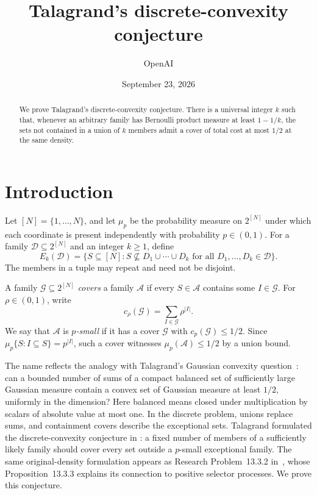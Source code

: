 \documentclass[11pt,letterpaper]{article}
\title{Talagrand's discrete-convexity conjecture}
\author{OpenAI}
\date{September 23, 2026}
\theoremstyle{definition}
\theoremstyle{remark}
\numberwithin{equation}{section}
\begin{document}
\maketitle
\begin{abstract}
We prove Talagrand's discrete-convexity conjecture.
There is a universal integer $k$ such that, whenever an arbitrary family has
Bernoulli product measure at least $1-1/k$, the sets not contained
in a union of $k$ members admit a cover of total cost at most $1/2$
at the same density.
\end{abstract}

\section{Introduction}
\label{sec:introduction}

Let $[N]=\{1,\ldots,N\}$, and let $\mu_p$ be the probability measure
on $2^{[N]}$ under which each coordinate is present independently with
probability $p\in(0,1)$. For a family $\mathcal D\subseteq2^{[N]}$ and
an integer $k\ge1$, define
\begin{equation}
\label{eq:exceptional-definition}
E_k(\mathcal D)
=\bigl\{S\subseteq[N]:
  S\nsubseteq D_1\cup\cdots\cup D_k
  \text{ for all }D_1,\ldots,D_k\in\mathcal D\bigr\}.
\end{equation}
The members in a tuple may repeat and need not be disjoint.

A family $\mathcal G\subseteq2^{[N]}$ \emph{covers} a family
$\mathcal A$ if every $S\in\mathcal A$ contains some $I\in\mathcal G$.
For $\rho\in(0,1)$, write
\[
c_\rho(\mathcal G)=\sum_{I\in\mathcal G}\rho^{|I|}.
\]
We say that $\mathcal A$ is \emph{$p$-small} if it has a cover
$\mathcal G$ with $c_p(\mathcal G)\le1/2$.
Since $\mu_p\{S:I\subseteq S\}=p^{|I|}$, such a cover witnesses
$\mu_p(\mathcal A)\le1/2$ by a union bound.

The name reflects the analogy with Talagrand's Gaussian convexity
question~\cite[Conjecture~2.1]{Talagrand10}: can a bounded number of
sums of a compact balanced set of sufficiently large Gaussian measure
contain a convex set of Gaussian measure at least $1/2$, uniformly in
the dimension? Here balanced means closed under multiplication by
scalars of absolute value at most one. In the discrete problem, unions
replace sums, and containment covers describe the exceptional sets.
Talagrand formulated the discrete-convexity conjecture in
\cite[Conjecture~7.1]{Talagrand10}: a fixed number of members of a
sufficiently likely family should cover every set outside a $p$-small
exceptional family. The same original-density formulation appears as
Research Problem~13.3.2 in~\cite{Talagrand21}, whose
Proposition~13.3.3 explains its connection to positive selector processes.
We prove this conjecture.
\end{document}
